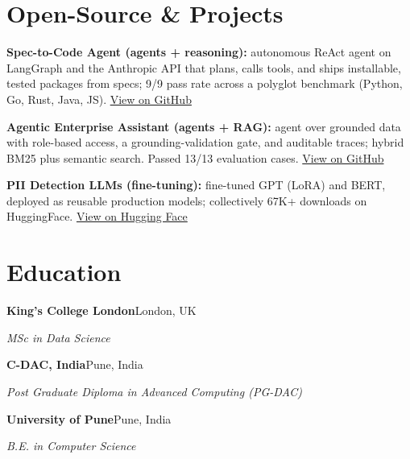 \documentclass[10pt,a4paper]{article}
\begin{document}
\section{Open-Source \& Projects}
\begin{tight}
  \item \textbf{Spec-to-Code Agent (agents + reasoning):} autonomous ReAct agent on LangGraph and the Anthropic API that plans, calls tools, and ships installable, tested packages from specs; 9/9 pass rate across a polyglot benchmark (Python, Go, Rust, Java, JS). \href{https://github.com/abhijeetscode/Spec-to-Code-Agent}{View on GitHub}
  \item \textbf{Agentic Enterprise Assistant (agents + RAG):} agent over grounded data with role-based access, a grounding-validation gate, and auditable traces; hybrid BM25 plus semantic search. Passed 13/13 evaluation cases. \href{https://github.com/abhijeetscode/Agentic-Enterprise-Assistant}{View on GitHub}
  \item \textbf{PII Detection LLMs (fine-tuning):} fine-tuned GPT (LoRA) and BERT, deployed as reusable production models; collectively 67K+ downloads on HuggingFace. \href{https://huggingface.co/ab-ai/pii_model}{View on Hugging Face}
\end{tight}

\section{Education}
{\color{company}\bfseries King's College London}\hfill {\color{muted}London, UK}\par
{\itshape MSc in Data Science}\par\vspace{2pt}
{\color{company}\bfseries C-DAC, India}\hfill {\color{muted}Pune, India}\par
{\itshape Post Graduate Diploma in Advanced Computing (PG-DAC)}\par\vspace{2pt}
{\color{company}\bfseries University of Pune}\hfill {\color{muted}Pune, India}\par
{\itshape B.E. in Computer Science}\par
\end{document}
